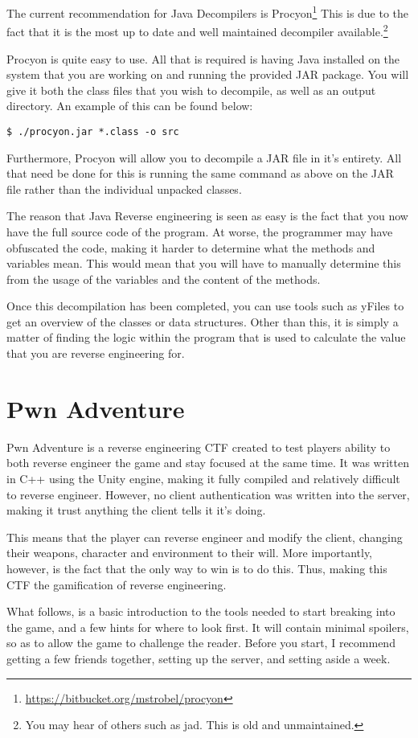 		The current recommendation for Java Decompilers is Procyon\footnote{\url{https://bitbucket.org/mstrobel/procyon}}
		This is due to the fact that it is the most up to date and well maintained decompiler available.\footnote{You may hear of others such as jad. This is old and unmaintained.} 
		
		Procyon is quite easy to use. 
		All that is required is having Java installed on the system that you are working on and running the provided JAR package. 
		You will give it both the class files that you wish to decompile, as well as an output directory. 
		An example of this can be found below:
		\begin{lstlisting}[style=CLI]
			$ ./procyon.jar *.class -o src
		\end{lstlisting}

		Furthermore, Procyon will allow you to decompile a JAR file in it's entirety. 
		All that need be done for this is running the same command as above on the JAR file rather than the individual unpacked classes. 

		The reason that Java Reverse engineering is seen as easy is the fact that you now have the full source code of the program. 
		At worse, the programmer may have obfuscated the code, making it harder to determine what the methods and variables mean. 
		This would mean that you will have to manually determine this from the usage of the variables and the content of the methods.

		Once this decompilation has been completed, you can use tools such as yFiles to get an overview of the classes or data structures. 
		Other than this, it is simply a matter of finding the logic within the program that is used to calculate the value that you are reverse engineering for. 
	
	\section{Pwn Adventure}
		Pwn Adventure is a reverse engineering CTF created to test players ability to both reverse engineer the game and stay focused at the same time.
		It was written in C++ using the Unity engine, making it fully compiled and relatively difficult to reverse engineer. 
		However, no client authentication was written into the server, making it trust anything the client tells it it's doing. 

		This means that the player can reverse engineer and modify the client, changing their weapons, character and environment to their will. 
		More importantly, however, is the fact that the only way to win is to do this.
		Thus, making this CTF the gamification of reverse engineering. 

		What follows, is a basic introduction to the tools needed to start breaking into the game, and a few hints for where to look first. 
		It will contain minimal spoilers, so as to allow the game to challenge the reader. 
		Before you start, I recommend getting a few friends together, setting up the server, and setting aside a week. 
